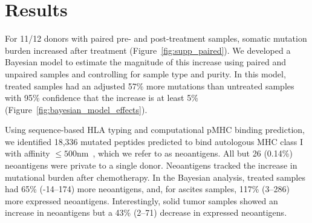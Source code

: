 \section*{Results}


For 11/12 donors with paired pre- and post-treatment samples, somatic mutation burden increased after treatment (Figure~\ref{fig:supp_paired}). We developed a Bayesian model to estimate the magnitude of this increase using paired and unpaired samples and controlling for sample type and purity. In this model, treated samples had an adjusted 57\% more mutations than untreated samples with 95\% confidence that the increase is at least 5\% (Figure~\ref{fig:bayesian_model_effects}).






Using sequence-based HLA typing and computational pMHC binding prediction, we identified 18,336 mutated peptides predicted to bind autologous MHC class I with affinity $\leq 500$nm~\cite{Sette1994}, which we refer to as neoantigens. All but 26 (0.14\%) neoantigens were private to a single donor. Neoantigens tracked the increase in mutational burden after chemotherapy. In the Bayesian analysis, treated samples had 65\% (-14--174) more neoantigens, and, for ascites samples, 117\% (3--286) more expressed neoantigens. Interestingly, solid tumor samples showed an increase in neoantigens but a 43\% (2--71) decrease in expressed neoantigens.

